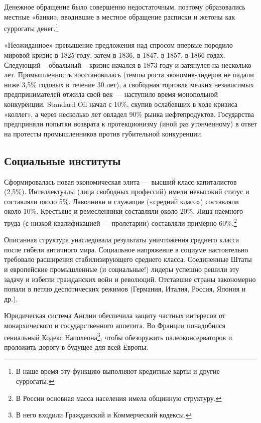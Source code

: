 Денежное обращение было совершенно недостаточным, поэтому образовались местные «банки», вводившие в местное обращение
расписки и жетоны как суррогаты денег.\footnote{В наше время эту функцию выполняют кредитные карты и
другие суррогаты.}


«Неожиданное» превышение предложения над спросом впервые породило мировой кризис в 1825 году, затем в 1836, в 1847, в
1857, в 1866 годах. Следующий – обвальный – кризис начался в 1873 году и затянулся на несколько лет. Промышленность
восстановилась (темпы роста экономик-лидеров не падали ниже 3,5\% годовых в течение 30 лет), а свободная торговля
мелких независимых предпринимателей отжила свой век — наступило время монопольной конкуренции.
\foreignlanguage{english}{Standard} \foreignlanguage{english}{Oil} начал с 10\%, скупив ослабевших в ходе кризиса
«коллег», а через несколько лет овладел 90\% рынка нефтепродуктов. Государства предприняли попытки возврата к
протекционизму (иной раз утонченному) в ответ на протесты промышленников против губительной конкуренции.

\subsection[Социальные институты ]{Социальные институты }

Сформировалась новая экономическая элита — высший класс капиталистов (2,5\%). Интеллектуалы (лица свободных профессий)
имели невысокий статус и составляли около 5\%. Лавочники и служащие («средний класс») составляли около 10\%. Крестьяне
и ремесленники составляли около 20\%. Лица наемного труда (с низкой квалификацией — пролетарии) составляли примерно
60\%.\footnote{В России основная масса населения имела общинную структуру.}


Описанная структура унаследовала результаты уничтожения среднего класса после гибели античного мира. Социальное
напряжение в социуме настоятельно требовало расширения стабилизирующего среднего класса. Соединенные Штаты и
европейские промышленные (и социальные!) лидеры успешно решили эту задачу и избегли гражданских войн и революций.
Отставшие страны закономерно попали в петлю деспотических режимов (Германия, Италия, Россия, Япония и др.).


Юридическая система Англии обеспечила защиту частных интересов от монархического и государственного аппетита. Во Франции
понадобился гениальный Кодекс Наполеона\footnote{В него входили Гражданский и Коммерческий кодексы.},
чтобы обезоружить палеоконсерваторов и проложить дорогу в будущее для всей Европы.


